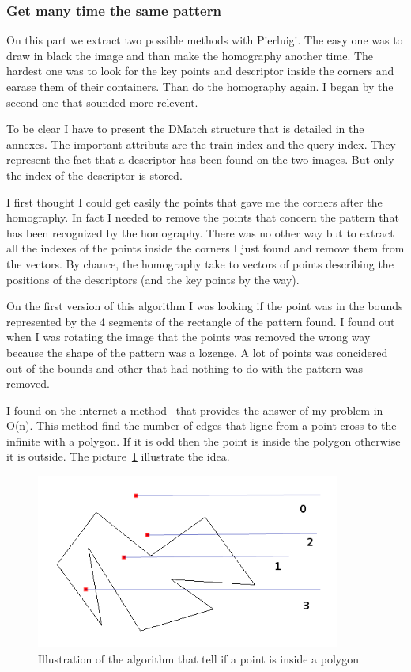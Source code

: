 	\subsubsection[Multiple pattern]{Get many time the same pattern}

	\par On this part we extract two possible methods with Pierluigi. The easy one was to draw in black the image and than make the homography another time. The hardest one was to look for the key points and descriptor inside the corners and earase them of their containers. Than do the homography again. I began by the second one that sounded more relevent. 
	
	\par To be clear I have to present the DMatch structure that is detailed in the \hyperlink{structDMatch}{annexes}. The important attributs are the train index and the query index. They represent the fact that a descriptor has been found on the two images. But only the index of the descriptor is stored.
	
	\par I first thought I could get easily the points that gave me the corners after the homography. In fact I needed to remove the points that concern the pattern that has been recognized by the homography. There was no other way but to extract all the indexes of the points inside the corners I just found and remove them from the vectors. By chance, the homography take to vectors of points describing the positions of the descriptors (and the key points by the way). 
	\par On the first version of this algorithm I was looking if the point was in the bounds represented by the 4 segments of the rectangle of the pattern found. I found out when I was rotating the image that the points was removed the wrong way because the shape of the pattern was a lozenge. A lot of points was concidered out of the bounds and other that had nothing to do with the pattern was removed.
	\par I found on the internet a method~\cite{InOut} that provides the answer of my problem in O(n). This method find the number of edges that ligne from a point cross to the infinite with a polygon. If it is odd then the point is inside the polygon otherwise it is outside. The picture~\ref{OutIn} illustrate the idea.
	\begin{figure}[h]
		\begin{center}
			\includegraphics[width=10cm]{images_not_compressed/isIn.png}
			\caption{Illustration of the algorithm that tell if a point is inside a polygon}
			\label{OutIn}	
		\end{center}
	\end{figure}
